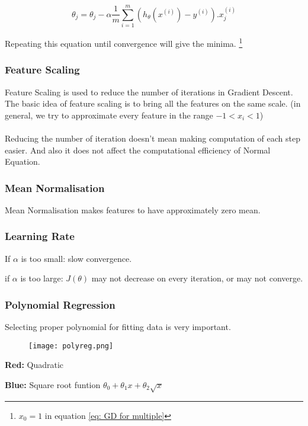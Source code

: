     \begin{equation} \label {eq: GD for multiple}
      \theta_j =  \theta_j - \alpha \frac{1}{m} \sum_{i=1}^{m} (h_\theta(x^{(i)})-y^{(i)}).x_j^{(i)}
    \end{equation}

    Repeating this equation until convergence will give the minima. \footnote[1]{$x_0 = 1$ in equation \ref{eq: GD for multiple}}

  \subsubsection{Feature Scaling}
    Feature Scaling is used to reduce the number of iterations in Gradient Descent. The basic idea of feature scaling is to bring all the features on the same scale. (in general, we try to approximate every feature in the range $ -1 < x_i < 1 $)
    \\ \\ Reducing the number of iteration doesn't mean making computation of each step easier. And also it does not affect the computational efficiency of Normal Equation.

  \subsubsection{Mean Normalisation}
    Mean Normalisation makes features to have approximately zero mean.

  \subsubsection{Learning Rate}
    If $\alpha$ is too small: slow convergence.

    if $\alpha$ is too large: $J(\theta)$ may not decrease on every iteration, or may not converge.

  \subsubsection{Polynomial Regression}
    Selecting proper polynomial for fitting data is very important.

    \begin{figure}[h]
      \centering
      \texttt{[image: polyreg.png]}
    \end{figure}

    \textbf{Red:} Quadratic

    \textbf {Blue:} Square root funtion $ \theta_0+\theta_1x+\theta_2\sqrt{x} $

